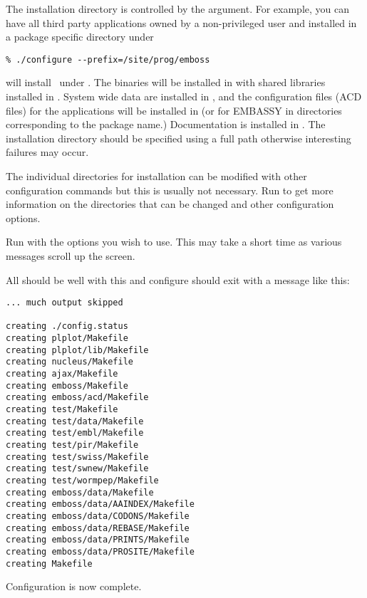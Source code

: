\documentclass{report}
\begin{document}
The installation directory is controlled by the 
argument. For example, you can have all third party applications owned
by a non-privileged user and installed in a package specific directory
under 

\begin{verbatim}
% ./configure --prefix=/site/prog/emboss
\end{verbatim}

will install \EMBOSS\ under . The binaries
will be installed in  with shared
libraries installed in . System wide
data are installed in ,
and the configuration files (ACD files) for the applications will be
installed in  (or for
EMBASSY in directories corresponding to the package name.)
Documentation is installed in
.  The installation
directory should be specified using a full path otherwise interesting
failures may occur.

The individual directories for installation can be modified with other
configuration commands but this is usually not necessary. Run
 to get more information on the directories
that can be changed and other configuration options.

Run  with the options you wish to use. This may
take a short time as various messages scroll up the screen.

All should be well with this and configure should exit with a message
like this:

\begin{verbatim}
... much output skipped

creating ./config.status
creating plplot/Makefile
creating plplot/lib/Makefile
creating nucleus/Makefile
creating ajax/Makefile
creating emboss/Makefile
creating emboss/acd/Makefile
creating test/Makefile
creating test/data/Makefile
creating test/embl/Makefile
creating test/pir/Makefile
creating test/swiss/Makefile
creating test/swnew/Makefile
creating test/wormpep/Makefile
creating emboss/data/Makefile
creating emboss/data/AAINDEX/Makefile
creating emboss/data/CODONS/Makefile
creating emboss/data/REBASE/Makefile
creating emboss/data/PRINTS/Makefile
creating emboss/data/PROSITE/Makefile
creating Makefile
\end{verbatim}

Configuration is now complete.
\end{document}
